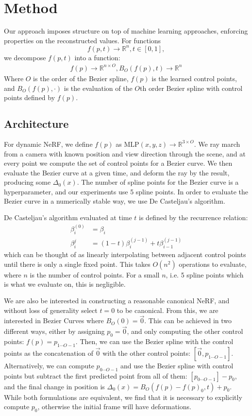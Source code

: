 \section*{Method}

Our approach imposes structure on top of machine learning
approaches, enforcing properties on the reconstructed values. For functions \[ f(p, t)\to\mathbb{R}^n, t\in[0,1], \] we decompose $f(p,t)$ into a function: 
\begin{align}
    f(p)\to\mathbb{R}^{n\times O}, B_O(f(p), t)\to\mathbb{R}^n
\end{align}
Where
$O$ is the order of the Bezier spline, $f(p)$ is the learned control points, and $B_O(f(p), \cdot)$ is the evaluation
of the $O$th order Bezier spline with control points defined by $f(p)$.

\subsection*{Architecture}

For dynamic NeRF, we define $f(p)$ as
$\text{MLP}(x,y,z)\to\mathbb{R}^{3\times O}$. We ray march from a camera with known position and
view direction through the scene, and at every point we compute the set of control points for a Bezier curve. We then evaluate the Bezier curve at a given time, and deform the ray by the result, producing some $\Delta_0(x)$. The number of spline points for the Bezier curve is a  hyperparameter, and our experiments use 5 spline points. In order to evaluate the Bezier curve in a numerically stable way, we use De Casteljau's algorithm. 

De Casteljau's algorithm evaluated at time $t$ is defined by the recurrence relation:
\begin{align}
  \beta_i^{(0)} &= \beta_i \nonumber \\
  \beta_i^{j} &= (1-t)\beta_i^{(j-1)} + t\beta_{i-1}^{(j-1)}
\end{align}
which can be thought of as linearly interpolating between adjacent control points until there is only a single fixed point. This takes $O(n^2)$ operations to evaluate, where $n$ is the number of control points. For a small $n$, i.e. 5 spline points which is what we evaluate on, this is negligible.

We are also be interested in constructing a reasonable canonical NeRF, and without loss of generality select $t = 0$ to be canonical. From this, we are interested in Bezier Curves where $B_O(0) = \overrightarrow{0}$. This can be achieved in two different ways, either by assigning $p_0 = \overrightarrow{0}$, and only computing the other control points: $f(p) = p_{1\cdots O-1}$. Then, we can use the Bezier spline with the control points as the concatenation of $\overrightarrow{0}$ with the other control points: $[\overrightarrow{0}, p_{1\cdots O-1}]$. Alternatively, we can compute $p_{0\cdots O-1}$ and use the Bezier spline with control points but subtract the first predicted point from all of them: $[p_{0\cdots O-1}]-p_0$, and the final change in position is $\Delta_0(x) = B_O(f(p)-f(p)_0,t)+p_0$. While both formulations are equivalent, we find that it is necessary to explicitly compute $p_0$, otherwise the initial frame will have deformations.

